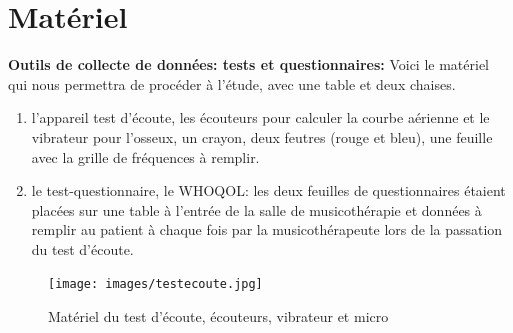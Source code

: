 


\section{Matériel}
\textbf{Outils de collecte de données: tests et questionnaires: }
Voici le matériel qui nous permettra de procéder à l'étude, avec une table et deux chaises.
\begin{enumerate}
	\item l'appareil
	test d'écoute, les écouteurs pour calculer la courbe  aérienne et le vibrateur pour l'osseux, un crayon, 
	deux
	feutres (rouge et bleu), une feuille avec la grille de fréquences à
	remplir.

	\item le test-questionnaire, le WHOQOL: 
les deux feuilles de questionnaires étaient placées sur une table à l'entrée de la salle de musicothérapie 
et données à remplir au patient à chaque fois par la musicothérapeute lors de la passation du test 
d'écoute. 
\end{enumerate}
\begin{figure}
	\centering
	\texttt{[image: images/testecoute.jpg]}
	\caption[Appareil test écoute]{Matériel du test d'écoute, écouteurs, vibrateur et micro}
	
	\label{appareiltestecoute}
\end{figure}

